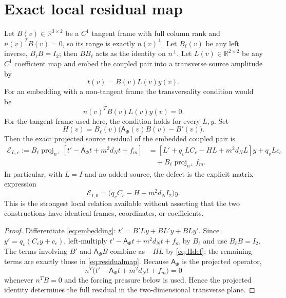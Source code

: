 \documentclass[11pt]{article}
\newcommand{\R}{\mathbb R}
\newcommand{\proj}{\operatorname{proj}}
\begin{document}
\section{Exact local residual map}
Let $B(v)\in\R^{3\times2}$ be a $C^1$ tangent frame with full column rank and
$n(v)^TB(v)=0$, so its range is exactly $n(v)^\perp$.  Let $B_\ell(v)$ be any
left inverse, $B_\ell B=I_2$; then $B B_\ell$ acts as the identity on
$n^\perp$.  Let $L(v)\in\R^{2\times2}$ be any $C^1$ coefficient map and embed
the coupled pair into a transverse source amplitude by
\begin{equation}
 t(v)=B(v)L(v)y(v).
 \label{eq:embedding}
\end{equation}
For an embedding with a non-tangent frame the transversality condition would be
\begin{equation}
 n(v)^TB(v)L(v)y(v)=0.
 \label{eq:transversecondition}
\end{equation}
For the tangent frame used here, the condition holds for every $L,y$.  Set
\begin{equation}
 H(v)=B_\ell(v)\bigl(\mathsf A_\Phi(v)B(v)-B'(v)\bigr).
 \label{eq:Hdef}
\end{equation}
Then the exact projected source residual of the embedded coupled pair is
\begin{align}
 \mathcal E_{L,c}:=B_\ell\proj_{n^\perp}
 \left[t'-\mathsf A_\Phi t+m^2d_Nt+f_m\right]
 &=\left[L'+q_vLC_c-HL+m^2d_NL\right]y+q_vLc_c \\
 &\quad+B_\ell\proj_{n^\perp}f_m.
 \label{eq:residualmap}
\end{align}
In particular, with $L=I$ and no added source, the defect is the explicit
matrix expression
\begin{equation}
 \mathcal E_{I,0}=\bigl(q_vC_c-H+m^2d_NI_2\bigr)y.
 \label{eq:identitydefect}
\end{equation}
This is the strongest local relation available without asserting that the two
constructions have identical frames, coordinates, or coefficients.

\begin{proof}
Differentiate \eqref{eq:embedding}:
$t'=B'L y+B L'y+B L y'$.  Since $y'=q_v(C_cy+c_c)$,
left-multiply $t'-\mathsf A_\Phi t+m^2d_Nt+f_m$ by $B_\ell$ and use
$B_\ell B=I_2$.  The terms involving $B'$ and $\mathsf A_\Phi B$ combine as
$-HL$ by \eqref{eq:Hdef}; the remaining terms are exactly those in
\eqref{eq:residualmap}.  Because $\mathsf A_\Phi$ is the projected operator,
\begin{equation}
 n^T\bigl(t'-\mathsf A_\Phi t+m^2d_Nt+f_m\bigr)=0
\end{equation}
whenever $n^TB=0$ and the forcing pressure below is used.  Hence the projected
identity determines the full residual in the two-dimensional transverse plane.
\end{proof}
\end{document}
